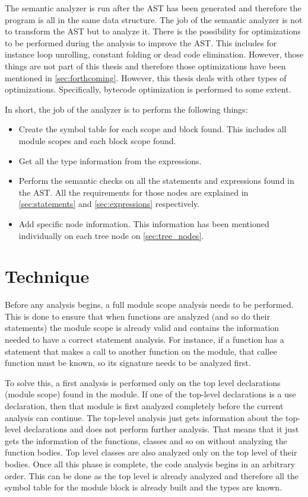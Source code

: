 The semantic analyzer is run after the AST has been generated and therefore the program is all in
the same data structure. The job of the semantic analyzer is not to transform the AST but to analyze it.
There is the possibility for optimizations to be performed during the analysis to improve the AST.
This includes for instance loop unrolling, constant folding or dead code elimination. However, those things
are not part of this thesis and therefore those optimizations have been mentioned in \autoref{sec:forthcoming}.
However, this thesis deals with other types of optimizations. Specifically, bytecode optimization is performed to some extent.

In short, the job of the analyzer is to perform the following things:

\begin{itemize}
    \item Create the symbol table for each scope and block found. This includes all module scopes and each block scope found.
    \item Get all the type information from the expressions.
    \item Perform the semantic checks on all the statements and expressions found in the AST. All the requirements for those nodes
        are explained in \autoref{sec:statements} and \autoref{sec:expressions} respectively.
    \item Add specific node information. This information has been mentioned individually on each tree node on \autoref{sec:tree_nodes}.
\end{itemize}

\section{Technique}

Before any analysis begins, a full module scope analysis needs to be performed. This is done to ensure that when functions are analyzed
(and so do their statements) the module scope is already valid and contains the information needed to have a correct statement analysis. For instance,
if a function has a statement that makes a call to another function on the module, that callee function must be known, so its signature needs to be
analyzed first.

To solve this, a first analysis is performed only on the top level declarations (module scope) found in the module.
If one of the top-level declarations is a use declaration, then that module is first analyzed completely before the current analysis can continue.
The top-level analysis just gets information about the top-level declarations and does not perform further analysis.
That means that it just gets the information of the functions, classes and so on without analyzing the function bodies.
Top level classes are also analyzed only on the top level of their bodies. Once all this phase is complete, the code analysis begins in an arbitrary order.
This can be done as the top level is already analyzed and therefore all the symbol table for the module block is already built and the types are known.

